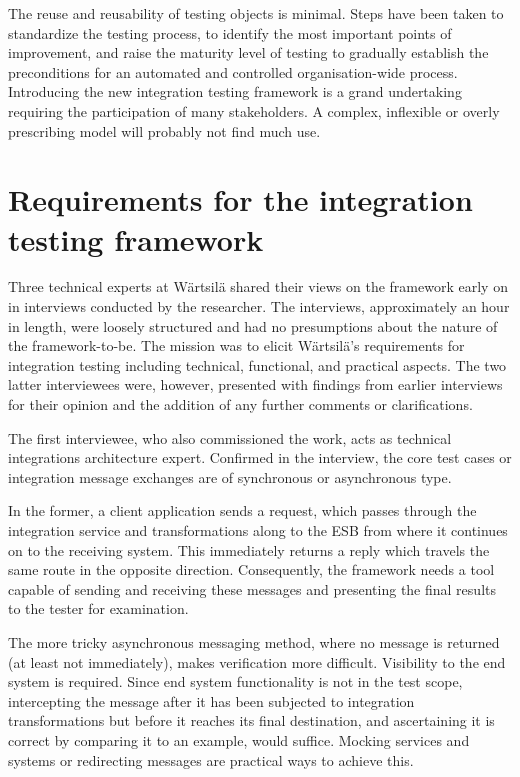 \documentclass[12pt,a4paper,oneside,pdftex]{report}
\begin{document}
The reuse and reusability of testing objects is minimal. Steps have been taken to standardize the testing process, to identify the most important points of improvement, and raise the maturity level of testing to gradually establish the preconditions for an automated and controlled organisation-wide process. Introducing the new integration testing framework is a grand undertaking requiring the participation of many stakeholders. A complex, inflexible or overly prescribing model will probably not find much use.


\section{Requirements for the integration testing framework} 
\label{section:requirements}


Three technical experts at Wärtsilä shared their views on the framework early on in interviews conducted by the researcher. The interviews, approximately an hour in length, were loosely structured and had no presumptions about the nature of the framework-to-be. The mission was to elicit Wärtsilä's requirements for integration testing including technical, functional, and practical aspects. The two latter interviewees were, however, presented with findings from earlier interviews for their opinion and the addition of any further comments or clarifications.

The first interviewee, who also commissioned the work, acts as technical integrations architecture expert. Confirmed in the interview, the core test cases or integration message exchanges are of synchronous or asynchronous type. 

In the former, a client application sends a request, which passes through the integration service and transformations along to the ESB from where it continues on to the receiving system. This immediately returns a reply which travels the same route in the opposite direction. Consequently, the framework needs a tool capable of sending and receiving these messages and presenting the final results to the tester for examination.

The more tricky asynchronous messaging method, where no message is returned (at least not immediately), makes verification more difficult. Visibility to the end system is required. Since end system functionality is not in the test scope, intercepting the message after it has been subjected to integration transformations but before it reaches its final destination, and ascertaining it is correct by comparing it to an example, would suffice. Mocking services and systems or redirecting messages are practical ways to achieve this.
\end{document}
